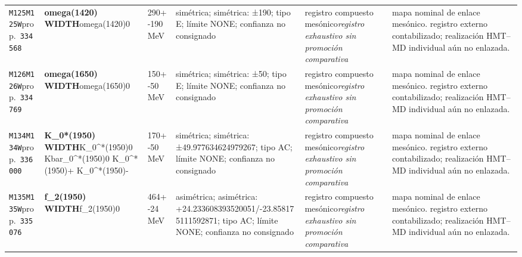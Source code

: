 \begin{landscape}
\begin{longtable}{L{1.85cm}L{4.45cm}L{2.35cm}L{4.05cm}L{3.35cm}L{7.15cm}}
\texttt{M125}\newline \texttt{M125W}\newline prop.\ \texttt{334568} & \textbf{omega(1420) WIDTH}\newline omega(1420)0 & 290+-190\,MeV & simétrica; simétrica: ±190; tipo E; límite NONE; confianza no consignado & registro compuesto mesónico\newline \emph{registro exhaustivo sin promoción comparativa} & mapa nominal de enlace mesónico. registro externo contabilizado; realización HMT--MD individual aún no enlazada. \\
\texttt{M126}\newline \texttt{M126W}\newline prop.\ \texttt{334769} & \textbf{omega(1650) WIDTH}\newline omega(1650)0 & 150+-50\,MeV & simétrica; simétrica: ±50; tipo E; límite NONE; confianza no consignado & registro compuesto mesónico\newline \emph{registro exhaustivo sin promoción comparativa} & mapa nominal de enlace mesónico. registro externo contabilizado; realización HMT--MD individual aún no enlazada. \\
\texttt{M134}\newline \texttt{M134W}\newline prop.\ \texttt{336000} & \textbf{K\_\allowbreak{}0*(1950) WIDTH}\newline K\_\allowbreak{}0\textasciicircum{}*(1950)0 \textbar{}\allowbreak{} Kbar\_\allowbreak{}0\textasciicircum{}*(1950)0 \textbar{}\allowbreak{} K\_\allowbreak{}0\textasciicircum{}*(1950)+ \textbar{}\allowbreak{} K\_\allowbreak{}0\textasciicircum{}*(1950)- & 170+-50\,MeV & simétrica; simétrica: ±49.977634624979267; tipo AC; límite NONE; confianza no consignado & registro compuesto mesónico\newline \emph{registro exhaustivo sin promoción comparativa} & mapa nominal de enlace mesónico. registro externo contabilizado; realización HMT--MD individual aún no enlazada. \\
\texttt{M135}\newline \texttt{M135W}\newline prop.\ \texttt{335076} & \textbf{f\_\allowbreak{}2(1950) WIDTH}\newline f\_\allowbreak{}2(1950)0 & 464+-24\,MeV & asimétrica; asimétrica: +24.233608393520051/-23.858175111592871; tipo AC; límite NONE; confianza no consignado & registro compuesto mesónico\newline \emph{registro exhaustivo sin promoción comparativa} & mapa nominal de enlace mesónico. registro externo contabilizado; realización HMT--MD individual aún no enlazada. \\

\end{longtable}
\end{landscape}
